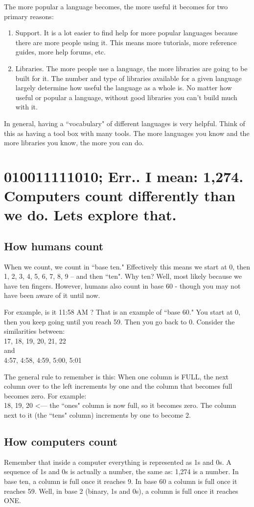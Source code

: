 \documentclass[a4paper,12pt]{article}
\let\stdsection\section
\renewcommand\section{\newpage\stdsection}
\begin{document}
The more popular a language becomes, the more useful it becomes for two primary reasons:
\begin{enumerate}
\item Support. It is a lot easier to find help for more popular languages because there are more people using it. This means more tutorials, more reference guides, more help forums, etc.
\item Libraries. The more people use a language, the more libraries are going to be built for it. The number and type of libraries available for a given language largely determine how useful the language as a whole is. No matter how useful or popular a language, without good libraries you can't build much with it.
\end{enumerate}
In general, having a ``vocabulary" of different languages is very helpful. Think of this as having a tool box with many tools. The more languages you know and the more libraries you know, the more you can do.
\section{010011111010; Err.. I mean: 1,274. Computers count differently than we do. Lets explore that.}
\subsection{How humans count}
When we count, we count in ``base ten." Effectively this means we start at 0, then 1, 2, 3, 4, 5, 6, 7, 8, 9 -- and then ``ten". Why ten? Well, most likely because we have ten fingers. However, humans also count in base 60 - though you may not have been aware of it until now.

For example, is it 11:58 AM ? That is an example of ``base 60." You start at 0, then you keep going until you reach 59. Then you go back to 0. Consider the similarities between:
\\17, 18, 19, 20, 21, 22
\\and
\\4:57, 4:58, 4:59, 5:00, 5:01

The general rule to remember is this: When one column is FULL, the next column over to the left increments by one and the column that becomes full becomes zero. For example:
\\18, 19, 20 \textless---  the ``ones" column is now full, so it becomes zero. The column next to it (the ``tens" column) increments by one to become 2.
\subsection{How computers count}
Remember that inside a computer everything is represented as 1s and 0s. A sequence of 1s and 0s is actually a number, the same as: 1,274 is a number. In base ten, a column is full once it reaches 9. In base 60 a column is full once it reaches 59. Well, in base 2 (binary, 1s and 0s), a column is full once it reaches ONE.
\end{document}
